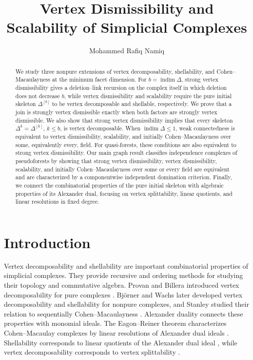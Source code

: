 \documentclass[11pt]{amsart}
\title{Vertex Dismissibility and Scalability of Simplicial Complexes}
\author{Mohammed Rafiq Namiq}
\theoremstyle{definition}
\begin{document}
	
	\begin{abstract}
		We study three nonpure extensions of vertex decomposability, shellability, and Cohen--Macaulayness at the minimum facet dimension. For $b=\operatorname{indim}\Delta$, strong vertex dismissibility gives a deletion--link recursion on the complex itself in which deletion does not decrease $b$, while vertex dismissibility and scalability require the pure initial skeleton $\Delta^{[b]}$ to be vertex decomposable and shellable, respectively. We prove that a join is strongly vertex dismissible exactly when both factors are strongly vertex dismissible. We also show that strong vertex dismissibility implies that every skeleton $\Delta^k=\Delta^{[k]}$, $k\le b$, is vertex decomposable. When $\operatorname{indim}\Delta\leq1$, weak connectedness is equivalent to vertex dismissibility, scalability, and initially Cohen--Macaulayness over some, equivalently every, field. For quasi-forests, these conditions are also equivalent to strong vertex dismissibility. Our main graph result classifies independence complexes of pseudoforests by showing that strong vertex dismissibility, vertex dismissibility, scalability, and initially Cohen--Macaulayness over some or every field are equivalent and are characterized by a componentwise independent domination criterion. Finally, we connect the combinatorial properties of the pure initial skeleton with algebraic properties of its Alexander dual, focusing on vertex splittability, linear quotients, and linear resolutions in fixed degree.
	\end{abstract}
	
	\maketitle
	
	\section{Introduction}\label{sec:1}
	
	Vertex decomposability and shellability are important combinatorial properties of simplicial complexes. They provide recursive and ordering methods for studying their topology and commutative algebra. Provan and Billera introduced vertex decomposability for pure complexes \cite{ProvanBillera1980}. Bj\"orner and Wachs later developed vertex decomposability and shellability for nonpure complexes, and Stanley studied their relation to sequentially Cohen--Macaulayness \cite{BjornerWachs1996,BjornerWachs1997,Stanley1996}. Alexander duality connects these properties with monomial ideals. The Eagon--Reiner theorem characterizes Cohen--Macaulay complexes by linear resolutions of Alexander dual ideals \cite{EagonReiner1998}. Shellability corresponds to linear quotients of the Alexander dual ideal \cite{HerzogHibiZheng2004}, while vertex decomposability corresponds to vertex splittability \cite{MoradiKhoshAhang2016}.
	
\end{document}
